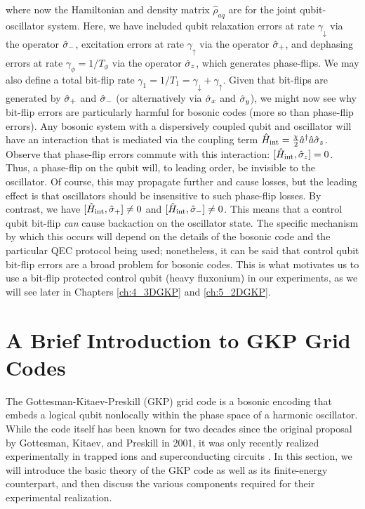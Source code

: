 where now the Hamiltonian and density matrix $\hat{\rho}_{aq}$ are for the joint qubit-oscillator system. Here, we have included qubit relaxation errors at rate $\gamma_\downarrow$ via the operator $\hat{\sigma}_-$, excitation errors at rate $\gamma_\uparrow$ via the operator $\hat{\sigma}_+$, and dephasing errors at rate $\gamma_\phi = 1/T_\phi$ via the operator $\hat{\sigma}_z$, which generates phase-flips. We may also define a total bit-flip rate $\gamma_1 = 1/T_1 = \gamma_\downarrow + \gamma_\uparrow$. Given that bit-flips are generated by $\hat{\sigma}_+$ and $\hat{\sigma}_-$ (or alternatively via $\hat{\sigma}_x$ and $\hat{\sigma}_y$), we might now see why bit-flip errors are particularly harmful for bosonic codes (more so than phase-flip errors). Any bosonic system with a dispersively coupled qubit and oscillator will have an interaction that is mediated via the coupling term $\hat{H}_{\rm int} = \frac{\chi}{2}\hat{a}^\dagger\hat{a}\hat{\sigma}_z$. Observe that phase-flip errors commute with this interaction: $[\hat{H}_{\rm int}, \hat{\sigma}_z] = 0$. Thus, a phase-flip on the qubit will, to leading order, be invisible to the oscillator. Of course, this may propagate further and cause losses, but the leading effect is that oscillators should be insensitive to such phase-flip losses. By contrast, we have $[\hat{H}_{\rm int}, \hat{\sigma}_+] \neq 0$ and $[\hat{H}_{\rm int}, \hat{\sigma}_-] \neq 0$. This means that a control qubit bit-flip \textit{can} cause backaction on the oscillator state. The specific mechanism by which this occurs will depend on the details of the bosonic code and the particular QEC protocol being used; nonetheless, it can be said that control qubit bit-flip errors are a broad problem for bosonic codes. This is what motivates us to use a bit-flip protected control qubit (heavy fluxonium) in our experiments, as we will see later in Chapters \ref{ch:4_3DGKP} and \ref{ch:5_2DGKP}. 

\clearpage
\section{A Brief Introduction to GKP Grid Codes\label{sec:2_Intro_to_GKP}}

The Gottesman-Kitaev-Preskill (GKP) grid code is a bosonic encoding that embeds a logical qubit nonlocally within the phase space of a harmonic oscillator. While the code itself has been known for two decades since the original proposal by Gottesman, Kitaev, and Preskill \cite{gottesman2001gkp} in 2001, it was only recently realized experimentally in trapped ions \cite{fluhmann2019gkp-expt, deneeve2022gkp-expt} and superconducting circuits \cite{campagne2020gkp-expt, sivak2023gkp-expt, nordquantique2023gkp-expt}. In this section, we will introduce the basic theory of the GKP code as well as its finite-energy counterpart, and then discuss the various components required for their experimental realization. 

